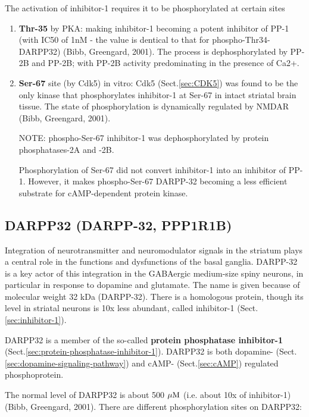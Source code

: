 The activation of inhibitor-1 requires it to be phosphorylated at certain sites
\begin{enumerate}
  
  \item {\bf Thr-35} by PKA: making inhibitor-1 becoming a potent inhibitor of
  PP-1 (with IC50 of 1nM - the value is dentical to that for phospho-Thr34-DARPP32)
  (Bibb, Greengard, 2001).
  The process is dephosphorylated by PP-2B and PP-2B; with PP-2B activity
  predominating in the presence of Ca2+.
  
  \item {\bf Ser-67} site (by Cdk5) in vitro: Cdk5 (Sect.\ref{sec:CDK5}) was
  found to be the only kinase that phosphorylates inhibitor-1 at Ser-67 in
  intact striatal brain tissue. The state of phosphorylation is dynamically
  regulated by NMDAR (Bibb, Greengard, 2001).
  
NOTE: phospho-Ser-67 inhibitor-1 was dephosphorylated by protein phosphatases-2A
and -2B.
    
Phosphorylation of Ser-67 did not convert inhibitor-1 into an inhibitor of
PP-1. However, it makes phospho-Ser-67 DARPP-32 becoming a less
efficient substrate for cAMP-dependent protein kinase.

\end{enumerate}



\subsection{DARPP32 (DARPP-32, PPP1R1B)}
\label{sec:DARPP32}
\label{sec:PPP1R1B}

Integration of neurotransmitter and neuromodulator signals in the striatum plays
a central role in the functions and dysfunctions of the basal ganglia. 
DARPP-32 is a key actor of this integration in the GABAergic medium-size spiny
neurons, in particular in response to dopamine and glutamate.
The name is given because of molecular weight 32 kDa (DARPP-32).
There is a homologous protein, though its level in striatal neurons is 10x less
abundant, called inhibitor-1 (Sect.\ref{sec:inhibitor-1}).


DARPP32 is a member of the so-called {\bf protein phosphatase inhibitor-1}
(Sect.\ref{sec:protein-phosphatase-inhibitor-1}). DARPP32 is both dopamine-
(Sect.\ref{sec:dopamine-signaling-pathway}) and cAMP-
(Sect.\ref{sec:cAMP}) regulated phosphoprotein.


The normal level of DARPP32 is  about 500 ${\mu\text{M}}$ (i.e. about 10x of
inhibitor-1) (Bibb, Greengard, 2001). There are different phosphorylation sites
on DARPP32:

